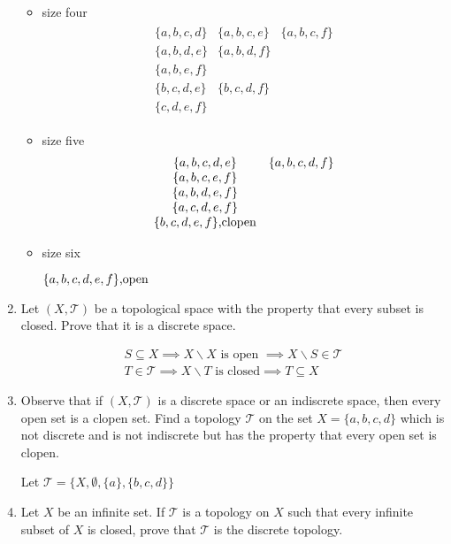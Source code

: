 \documentclass[10pt,a4paper]{report}
\newcommand{\TT}{\mathcal{T}}
\begin{document}
\begin{enumerate}
\begin{itemize}
	\item size four
	\begin{align*}
		\begin{array}{ccc}
			\{a,b,c,d\} & \{a,b,c,e\} & \{a,b,c,f\}\\
			\{a,b,d,e\} & \{a,b,d,f\}\\
			\{a,b,e,f\}\\
			\{b,c,d,e\} & \{b,c,d,f\}\\
			\{c,d,e,f\}
		\end{array}
	\end{align*}
	
	\item size five
	\begin{align*}
		\begin{array}{cc}
			\{a,b,c,d,e\} & \{a,b,c,d,f\} \\
			\{a,b,c,e,f\}\\
			\{a,b,d,e,f\}\\
			\{a,c,d,e,f\}\\
			\{b,c,d,e,f\}\text{,clopen}
		\end{array}
	\end{align*}
	
	\item size six
	
		$\{a,b,c,d,e,f\}\text{,open}$
\end{itemize}

\newpage
\item Let $(X,\TT)$ be a topological space with the property that every subset is closed.  Prove that it is a discrete space.

\begin{align*}
	S \subseteq X \implies X\backslash X \text{ is open } \implies X\backslash S \in \TT \\
	T \in \TT \implies X\backslash T \text{ is closed} \implies T \subseteq X
\end{align*}

\item Observe that if $(X,\TT)$ is a discrete space or an indiscrete space, then every open set is a clopen set.  Find a topology $\TT$ on the set $X=\{a,b,c,d\}$ which is not discrete and is not indiscrete but has the property that every open set is clopen.

Let $\TT = \{X, \emptyset, \{a\}, \{b,c,d\}\}$

\item Let $X$ be an infinite set.  If $\TT$ is a topology on $X$ such that every infinite subset of $X$ is closed, prove that $\TT$ is the discrete topology.


\end{enumerate}
\end{document}

